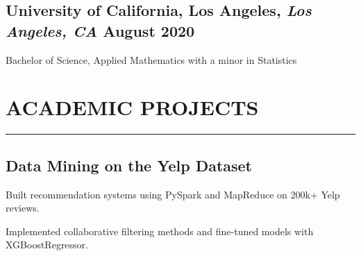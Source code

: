 \documentclass[11pt]{article}
\begin{document}
\subsection*{University of California, Los Angeles{\normalfont, \textit{Los Angeles, CA} \hfill August 2020}}
Bachelor of Science, Applied Mathematics with a minor in Statistics

\vspace{0.1in}

\section*{\MakeUppercase{Academic Projects}}
\hrule
\medskip
\subsection*{Data Mining on the Yelp Dataset \hfill {}}
\noindent
\begin{asparaitem}
    \item Built recommendation systems using PySpark and MapReduce on 200k+ Yelp reviews.
    \item Implemented collaborative filtering methods and fine-tuned models with XGBoostRegressor.
\end{asparaitem}
\end{document}
